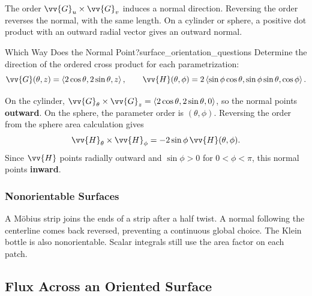 The order $\vv{G}_u \times \vv{G}_v$ induces a normal direction. Reversing the order reverses the normal, with the same length. On a cylinder or sphere, a positive dot product with an outward radial vector gives an outward normal.

\begin{problem}{Which Way Does the Normal Point?}{surface_orientation_questions}
Determine the direction of the ordered cross product for each parametrization:
\[
    \vv{G}(\theta,z) = \ang{2\cos\theta,2\sin\theta,z},\qquad
    \vv{H}(\theta,\phi) = 2\ang{\sin\phi\cos\theta,\sin\phi\sin\theta,\cos\phi}.
\]
\end{problem}
\begin{sol}
On the cylinder,
$\vv{G}_{\theta} \times \vv{G}_z = \ang{2\cos\theta,2\sin\theta,0}$, so the normal points \textbf{outward}.
On the sphere, the parameter order is $(\theta,\phi)$. Reversing the order from the sphere area calculation gives
\[
    \vv{H}_{\theta} \times \vv{H}_{\phi} = -2\sin\phi\,\vv{H}(\theta,\phi).
\]
Since $\vv{H}$ points radially outward and $\sin\phi > 0$ for $0 < \phi < \pi$, this normal points \textbf{inward}.
\end{sol}

\subsubsection{Nonorientable Surfaces}
\begin{minipage}[c]{0.65\linewidth}
A M\"obius strip joins the ends of a strip after a half twist. A normal following the centerline comes back reversed, preventing a continuous global choice. The Klein bottle is also nonorientable. Scalar integrals still use the area factor on each patch.
\end{minipage}\hfill
\begin{minipage}[c]{0.31\linewidth}
\centering
{}
\end{minipage}

\newpage
\subsection{Flux Across an Oriented Surface}

